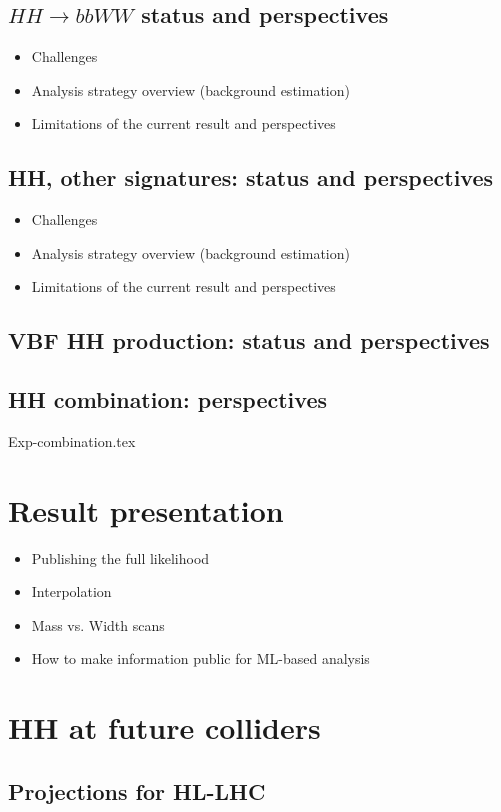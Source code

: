 \documentclass{book}
\begin{document}
\section{$HH \to bbWW$ status and perspectives}
\begin{itemize}
\item Challenges
\item Analysis strategy overview (background estimation)
\item Limitations of the current result and perspectives
\end{itemize}
\section{HH, other signatures: status and perspectives}
\begin{itemize}
\item Challenges
\item Analysis strategy overview (background estimation)
\item Limitations of the current result and perspectives
\end{itemize}

\section{VBF HH production: status and perspectives}
\section{HH combination: perspectives}
{Exp-combination.tex}
\chapter{Result presentation}
\begin{itemize}
    \item Publishing the full likelihood 
    \item Interpolation
    \item Mass vs. Width scans
    \item How to make information public for ML-based analysis 
   
\end{itemize}
\chapter{HH at future colliders}
\section{Projections for HL-LHC}
\end{document}
